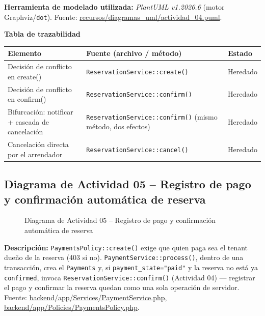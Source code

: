 \bigskip
{\sloppy\noindent\textbf{Herramienta de modelado utilizada:} \textit{PlantUML v1.2026.6} (motor Graphviz/\texttt{dot}). Fuente: \url{recursos/diagramas_uml/actividad_04.puml}.\par}

\bigskip
\noindent\textbf{Tabla de trazabilidad}
\begin{longtable}{|L{4cm}|L{7.5cm}|M{2.3cm}|}
\hline
{} \textbf{Elemento} & \textbf{Fuente (archivo / método)} & \textbf{Estado} \\ \hline
\endhead
Decisión de conflicto en create() & \texttt{ReservationService::create()} & Heredado \\ \hline
Decisión de conflicto en confirm() & \texttt{ReservationService::confirm()} & Heredado \\ \hline
Bifurcación: notificar + cascada de cancelación & \texttt{ReservationService::confirm()} (mismo método, dos efectos) & Heredado \\ \hline
Cancelación directa por el arrendador & \texttt{ReservationService::cancel()} & Heredado \\ \hline
\end{longtable}
\clearpage

\subsection{Diagrama de Actividad 05 -- Registro de pago y confirmación automática de reserva}
\begin{figure}[H]
    \centering
    \caption{Diagrama de Actividad 05 -- Registro de pago y confirmación automática de reserva}
    \label{fig:actividad05}
\end{figure}

{\sloppy\noindent\textbf{Descripción:} \texttt{PaymentsPolicy::create()} exige que quien paga sea el tenant dueño de la reserva (403 si no). \texttt{PaymentService::process()}, dentro de una transacción, crea el \texttt{Payments} y, si \texttt{payment\_state="paid"} y la reserva no está ya \texttt{confirmed}, invoca \texttt{ReservationService::confirm()} (Actividad 04) --- registrar el pago y confirmar la reserva quedan como una sola operación de servidor. Fuente: \url{backend/app/Services/PaymentService.php}, \url{backend/app/Policies/PaymentsPolicy.php}.\par}

